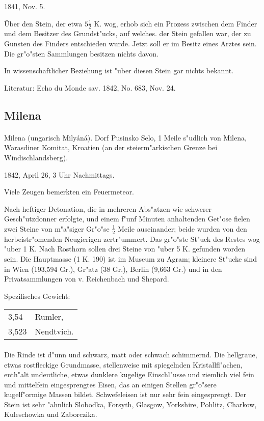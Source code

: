 \documentclass[a4paper, 11pt, oneside]{article}
\begin{document}
1841, Nov. 5.

Über den Stein, der etwa $5\frac{1}{2}$ K. wog, erhob sich ein Prozess zwischen dem Finder und dem Besitzer des Grundst"ucks, auf welches. der Stein gefallen war, der zu Gunsten des Finders entschieden wurde. Jetzt soll er im Besitz eines Arztes sein. Die gr"o"sten Sammlungen besitzen nichts davon.

In wissenschaftlicher Beziehung ist "uber diesen Stein gar nichts bekannt.

\footnotesize
Literatur: Echo du Monde sav. 1842, No. 683, Nov. 24.

\subsection{Milena}
\normalsize
\paragraph{}
Milena (ungarisch Milyáná). Dorf Pusinsko Selo, 1 Meile s"udlich von Milena, Warasdiner Komitat, Kroatien (an der steierm"arkischen Grenze bei Windischlandsberg).

1842, April 26, 3 Uhr Nachmittags.

Viele Zeugen bemerkten ein Feuermeteor.

Nach heftiger Detonation, die in mehreren Abs"atzen wie schwerer Gesch"utzdonner erfolgte, und einem f"unf Minuten anhaltenden Get"ose fielen zwei Steine von m"a"siger Gr"o"se $\frac{1}{2}$ Meile auseinander; beide wurden von den herbeistr"omenden Neugierigen zertr"ummert. Das gr"o"ste St"uck des Restes wog "uber 1 K. Nach Rosthorn sollen drei Steine von "uber 5 K. gefunden worden sein. Die Hauptmasse (1 K. 190) ist im Museum zu Agram; kleinere St"ucke sind in Wien (193,594 Gr.), Gr"atz (38 Gr.), Berlin (9,663 Gr.) und in den Privatsammlungen von v. Reichenbach und Shepard.

Spezifisches Gewicht:  
\begin{table}[!ht]
    \centering
    \begin{tabular}{l l}
        3,54 & Rumler,\\
        3,523 & Nendtvich.
    \end{tabular}
\end{table}
\paragraph{}
Die Rinde ist d"unn und schwarz, matt oder schwach schimmernd. Die hellgraue, etwas rostfleckige Grundmasse, stellenweise mit spiegelnden Kristallfl"achen, enth"alt undeutliche, etwas dunklere kugelige Einschl"usse und ziemlich viel fein und mittelfein eingesprengtes Eisen, das an einigen Stellen gr"o"sere kugelf"ormige Massen bildet. Schwefeleisen ist nur sehr fein eingesprengt. Der Stein ist sehr "ahnlich Slobodka, Forsyth, Glasgow, Yorkshire, Pohlitz, Charkow, Kuleschowka und Zaborczika.
\end{document}
